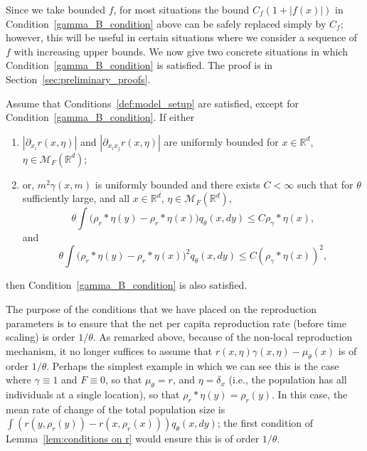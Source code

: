 \documentclass[EJP]{ejpecp} %
\newcommand{\IR}{\mathbb R}
\newcommand{\kernel}{\rho}  %
\newcommand{\smooth}[1]{\kernel_{#1} \! * \!}  %
\newcommand{\measures}{\mathcal{M}_F(\IR^d)} %
\begin{document}
Since we take bounded $f$,
for most situations the bound $C_f(1+|f(x)|)$ in Condition~\ref{gamma_B_condition} above
can be safely replaced simply by $C_f$;
however, this will be useful
in certain situations where we consider a sequence of $f$ with increasing upper bounds.
We now give two concrete situations in which Condition~\ref{gamma_B_condition} is satisfied.
The proof is in Section~\ref{sec:preliminary_proofs}.

\begin{lemma}
    \label{lem:conditions on r}
    Assume that Conditions~\ref{def:model_setup} are satisfied,
    except for Condition~\ref{gamma_B_condition}.
    If either
\begin{enumerate}
\item
\label{control through r} 
    $|\partial_{x_i}r(x,\eta)|$ and 
    $|\partial_{x_ix_j}r(x,\eta)|$
    are uniformly bounded for $x\in\IR^d$, $\eta\in\measures$;
\item 
\label{control through gamma}
    or, $m^2\gamma(x,m)$ is uniformly bounded and there exists $C<\infty$
    such that for $\theta$ sufficiently large, and all $x\in\IR^d$, $\eta\in\measures$,
    \[
    \theta\int\big(\smooth{r}\eta(y)-\smooth{r}\eta(x)\big)q_\theta(x,dy)\leq C\smooth{\gamma}\eta(x),
    \]
    and
    \[\theta\int\big(\smooth{r}\eta(y)-\smooth{r}\eta(x)\big)^2q_\theta(x,dy)
    \leq C(\smooth{\gamma}\eta(x))^2 ,
    \]
\end{enumerate} 
    then Condition~\ref{gamma_B_condition} is also satisfied.
\end{lemma}

The purpose of the conditions that we have placed on the reproduction parameters is to 
ensure that the net per capita reproduction rate (before time scaling)
is order $1/\theta$. As remarked above, 
because of the non-local reproduction mechanism, it no longer suffices 
to assume that 
$r(x,\eta)\gamma(x,\eta)-\mu_\theta(x)$ is of order $1/\theta$.
Perhaps the simplest example in which we can see this
is the case where $\gamma \equiv 1$ and $F \equiv 0$, so that $\mu_\theta = r$,
and $\eta = \delta_x$
(i.e., the population has all individuals at a single location),
so that $\smooth{r} \eta(y) = \rho_r(y)$.
In this case, the mean rate of change of the total population size
is $\int (r(y, \rho_r(y) ) - r(x, \rho_r(x))) q_\theta(x, dy)$;
the first condition of Lemma~\ref{lem:conditions on r} would ensure this is of order $1/\theta$.
\end{document}
